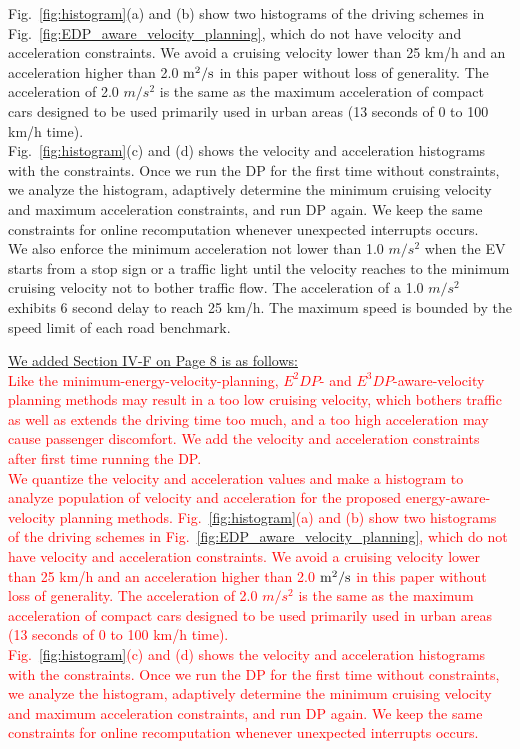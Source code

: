 \documentclass[onecolumn]{IEEEconf}
\begin{document}
\begin{description}
Fig.~\ref{fig:histogram}(a) and (b) show two histograms of the driving schemes in Fig.~\ref{fig:EDP_aware_velocity_planning}, which do not have velocity and acceleration constraints. We avoid a cruising velocity lower than 25 km/h and an acceleration higher than 2.0 $\rm{m^2}/s$ in this paper without loss of generality. The  acceleration of 2.0 $m/s^2$ is the same as the maximum acceleration of compact cars designed to be used primarily used in urban areas (13 seconds of 0 to 100 km/h time).\\
Fig.~\ref{fig:histogram}(c) and (d) shows the velocity and acceleration histograms with the constraints. Once we run the DP for the first time without constraints, we analyze the histogram, adaptively determine the minimum cruising velocity and maximum acceleration constraints, and run DP again. We keep the same constraints for online recomputation whenever unexpected interrupts occurs.\\
We also enforce the minimum acceleration not lower than 1.0 $m/s^2$ when the EV starts from a stop sign or a traffic light until the velocity reaches to the minimum cruising velocity not to bother traffic flow. The acceleration of a 1.0 $m/s^2$ exhibits 6 second delay to reach 25 km/h. The maximum speed is bounded by the speed limit of each road benchmark.


\uline{We added Section IV-F on Page 8 is as follows:}\\
\textcolor{red}{Like the minimum-energy-velocity-planning, $E^2DP$- and $E^3DP$-aware-velocity planning methods may result in a too low cruising velocity, which bothers traffic as well as extends the driving time too much, and a too high acceleration may cause passenger discomfort. We add the velocity and acceleration constraints after first time running the DP. \\
We quantize the velocity and acceleration values and make a histogram to analyze population of velocity and acceleration for the proposed energy-aware-velocity planning methods. Fig.~\ref{fig:histogram}(a) and (b) show two histograms of the driving schemes in Fig.~\ref{fig:EDP_aware_velocity_planning}, which do not have velocity and acceleration constraints. We avoid a cruising velocity lower than 25 km/h and an acceleration higher than 2.0 $\rm{m^2}/s$ in this paper without loss of generality. The  acceleration of 2.0 $m/s^2$ is the same as the maximum acceleration of compact cars designed to be used primarily used in urban areas (13 seconds of 0 to 100 km/h time).\\
Fig.~\ref{fig:histogram}(c) and (d) shows the velocity and acceleration histograms with the constraints. Once we run the DP for the first time without constraints, we analyze the histogram, adaptively determine the minimum cruising velocity and maximum acceleration constraints, and run DP again. We keep the same constraints for online recomputation whenever unexpected interrupts occurs.} 


\end{description}
\end{document}
